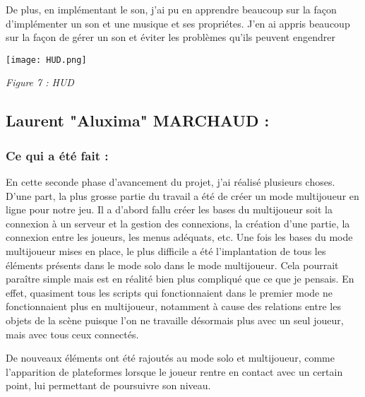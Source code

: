 \documentclass{article}
\begin{document}
De plus, en implémentant le son, j'ai pu en apprendre beaucoup sur la façon d'implémenter un son et une musique et ses propriétes. J'en ai appris beaucoup sur la façon de gérer un son et éviter les problèmes qu'ils peuvent engendrer

\quad

\quad

\begin{centering}

\texttt{[image: HUD.png]}

\quad

\textit{Figure 7 : HUD }

\end{centering}

\quad

\newpage

	\subsection{Laurent "Aluxima" MARCHAUD :}

\quad



		\subsubsection{Ce qui a été fait :}

\quad 

\quad

En cette seconde phase d’avancement du projet, j’ai réalisé plusieurs choses. D’une part, la plus grosse partie du travail a été de créer un mode multijoueur en ligne pour notre jeu. Il a d’abord fallu créer les bases du multijoueur soit la connexion à un serveur et la gestion des connexions, la création d’une partie, la connexion entre les joueurs, les menus adéquats, etc. Une fois les bases du mode multijoueur mises en place, le plus difficile a été l’implantation de tous les éléments présents dans le mode solo dans le mode multijoueur. Cela pourrait paraître simple mais est en réalité bien plus compliqué que ce que je pensais. En effet, quasiment tous les scripts qui fonctionnaient dans le premier mode ne fonctionnaient plus en multijoueur, notamment à cause des relations entre les objets de la scène puisque l’on ne travaille désormais plus avec un seul joueur, mais avec tous ceux connectés.

De nouveaux éléments ont été rajoutés au mode solo et multijoueur, comme l’apparition de plateformes lorsque le joueur rentre en contact avec un certain point, lui permettant de poursuivre son niveau.
\end{document}
